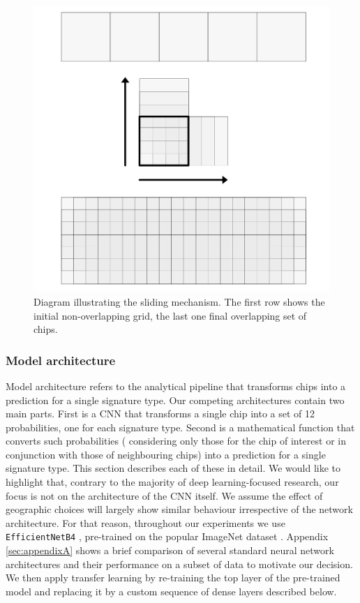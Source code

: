 \begin{figure}
    \centering
    \includegraphics[width=.8\linewidth]{fig/sliding.png}
    \caption{Diagram illustrating the sliding mechanism. The first row shows the initial non-overlapping grid, the last one final overlapping set of chips.}
    \label{fig:sliding}
\end{figure}


\subsubsection{Model architecture}



Model architecture refers to the analytical pipeline that transforms chips
into a prediction for a single signature type. Our competing architectures
contain two main parts. First is a CNN that transforms a single chip into a
set of 12 probabilities, one for each signature type.
Second is a mathematical function that converts such probabilities (
considering only those for the chip of interest or in conjunction with
those of neighbouring chips) into a
prediction for a single signature type. This section describes each of these in detail.
We would like to highlight that, contrary to the majority of deep
learning-focused research, our focus is not on the architecture of the CNN
itself. We assume the effect of geographic choices will largely show similar
behaviour irrespective of the network architecture. For that reason, throughout
our experiments we use \texttt{EfficientNetB4} \citep{https://doi.org/10.48550/arxiv.1905.11946}, pre-trained
on the popular ImageNet dataset \citep{deng2009imagenet}. Appendix \ref*{sec:appendixA} shows a brief comparison of
several standard neural network architectures and their performance on a subset of data
to motivate our decision. We then apply transfer learning by re-training the
top layer of the pre-trained model and replacing it by a
custom sequence of dense layers described below.

